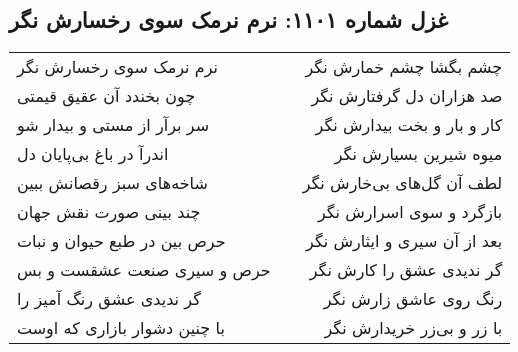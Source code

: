 \begin{center}
\section*{غزل شماره ۱۱۰۱: نرم نرمک سوی رخسارش نگر}
\label{sec:1101}
\begin{longtable}{l p{0.5cm} r}
نرم نرمک سوی رخسارش نگر
&&
چشم بگشا چشم خمارش نگر
\\
چون بخندد آن عقیق قیمتی
&&
صد هزاران دل گرفتارش نگر
\\
سر برآر از مستی و بیدار شو
&&
کار و بار و بخت بیدارش نگر
\\
اندرآ در باغ بی‌پایان دل
&&
میوه شیرین بسیارش نگر
\\
شاخه‌های سبز رقصانش ببین
&&
لطف آن گل‌های بی‌خارش نگر
\\
چند بینی صورت نقش جهان
&&
بازگرد و سوی اسرارش نگر
\\
حرص بین در طبع حیوان و نبات
&&
بعد از آن سیری و ایثارش نگر
\\
حرص و سیری صنعت عشقست و بس
&&
گر ندیدی عشق را کارش نگر
\\
گر ندیدی عشق رنگ آمیز را
&&
رنگ روی عاشق زارش نگر
\\
با چنین دشوار بازاری که اوست
&&
با زر و بی‌زر خریدارش نگر
\\
\end{longtable}
\end{center}
